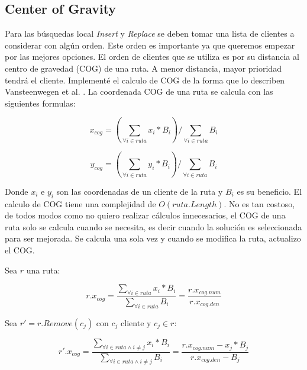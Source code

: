 \subsection{Center of Gravity}

Para las búsquedas local \textit{Insert} y \textit{Replace} se deben tomar una lista de clientes a considerar con algún orden. Este orden es importante ya que queremos empezar por las mejores opciones. El orden de clientes que se utiliza es por su distancia al centro de gravedad (COG) de una ruta. A menor distancia, mayor prioridad tendrá el cliente. Implementé el calculo de COG de la forma que lo describen Vansteenwegen et al. \cite{VansteenwegenSouffriauBergheOudheusden}. La coordenada COG de una ruta se calcula con las siguientes formulas:

\begin{equation}
x_{cog} = (\sum_{\forall i \in ruta} x_i * B_i) / \sum_{\forall i \in ruta} B_i
\end{equation}

\begin{equation}
y_{cog} = (\sum_{\forall i \in ruta} y_i * B_i) / \sum_{\forall i \in ruta} B_i
\end{equation}

\bigskip

Donde $x_i$ e $y_i$ son las coordenadas de un cliente de la ruta y $B_i$ es su beneficio.
El calculo de COG tiene una complejidad de $O(ruta.Length)$. No es tan costoso, de todos modos como no quiero realizar cálculos innecesarios, el COG de una ruta solo se calcula cuando se necesita, es decir cuando la solución es seleccionada para ser mejorada. Se calcula una sola vez y cuando se modifica la ruta, actualizo el COG.

\bigskip

Sea $r$ una ruta:

\begin{equation}
r.x_{cog} =  \frac{\sum_{\forall i \in ruta} x_i * B_i}{\sum_{\forall i \in ruta} B_i}  = \frac{r.x_{cog.num}}{r.x_{cog.den}}
\end{equation}

\bigskip

Sea $r' = r.Remove(c_j)$ con $c_j$ cliente y $c_j \in r$:

\begin{equation}
r'.x_{cog} =  \frac{\sum_{\forall i \in ruta \wedge i \neq j} x_i * B_i}{\sum_{\forall i \in ruta \wedge i \neq j} B_i}  = \frac{r.x_{cog.num}-x_j*B_j}{r.x_{cog.den}-B_j}
\end{equation}

